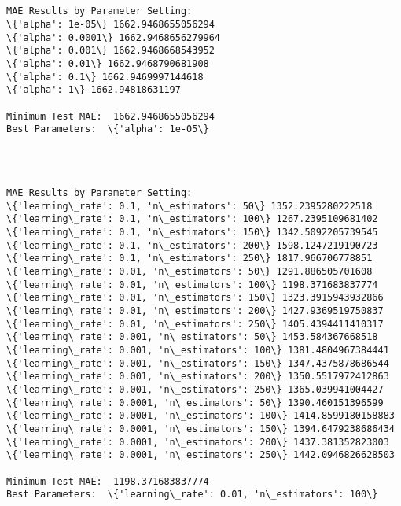 \documentclass[11pt]{article}
\begin{document}
    \begin{center}
    \end{center}
    { \hspace*{\fill} \\}
    
    \begin{Verbatim}[commandchars=\\\{\}]

MAE Results by Parameter Setting:
\{'alpha': 1e-05\} 1662.9468655056294
\{'alpha': 0.0001\} 1662.9468656279964
\{'alpha': 0.001\} 1662.9468668543952
\{'alpha': 0.01\} 1662.9468790681908
\{'alpha': 0.1\} 1662.9469997144618
\{'alpha': 1\} 1662.94818631197

Minimum Test MAE:  1662.9468655056294
Best Parameters:  \{'alpha': 1e-05\}
\end{Verbatim}

    \begin{center}
    \end{center}
    { \hspace*{\fill} \\}
    
    \begin{Verbatim}[commandchars=\\\{\}]

MAE Results by Parameter Setting:
\{'learning\_rate': 0.1, 'n\_estimators': 50\} 1352.2395280222518
\{'learning\_rate': 0.1, 'n\_estimators': 100\} 1267.2395109681402
\{'learning\_rate': 0.1, 'n\_estimators': 150\} 1342.5092205739545
\{'learning\_rate': 0.1, 'n\_estimators': 200\} 1598.1247219190723
\{'learning\_rate': 0.1, 'n\_estimators': 250\} 1817.966706778851
\{'learning\_rate': 0.01, 'n\_estimators': 50\} 1291.886505701608
\{'learning\_rate': 0.01, 'n\_estimators': 100\} 1198.371683837774
\{'learning\_rate': 0.01, 'n\_estimators': 150\} 1323.3915943932866
\{'learning\_rate': 0.01, 'n\_estimators': 200\} 1427.9369519750837
\{'learning\_rate': 0.01, 'n\_estimators': 250\} 1405.4394411410317
\{'learning\_rate': 0.001, 'n\_estimators': 50\} 1453.584367668518
\{'learning\_rate': 0.001, 'n\_estimators': 100\} 1381.4804967384441
\{'learning\_rate': 0.001, 'n\_estimators': 150\} 1347.4375878686544
\{'learning\_rate': 0.001, 'n\_estimators': 200\} 1350.5517972412863
\{'learning\_rate': 0.001, 'n\_estimators': 250\} 1365.039941004427
\{'learning\_rate': 0.0001, 'n\_estimators': 50\} 1390.460151396599
\{'learning\_rate': 0.0001, 'n\_estimators': 100\} 1414.8599180158883
\{'learning\_rate': 0.0001, 'n\_estimators': 150\} 1394.6479238686434
\{'learning\_rate': 0.0001, 'n\_estimators': 200\} 1437.381352823003
\{'learning\_rate': 0.0001, 'n\_estimators': 250\} 1442.0946826628503

Minimum Test MAE:  1198.371683837774
Best Parameters:  \{'learning\_rate': 0.01, 'n\_estimators': 100\}
\end{Verbatim}
\end{document}
